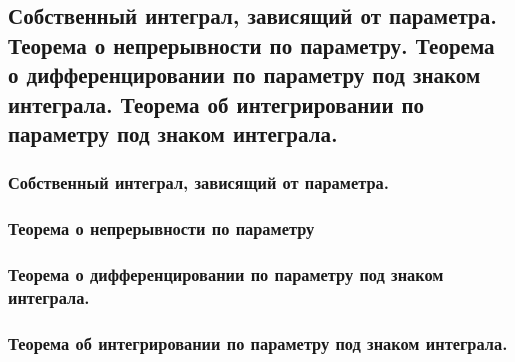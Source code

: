 \subsection{Собственный интеграл, зависящий от параметра. Теорема о непрерывности по параметру. Теорема о дифференцировании по параметру под знаком интеграла. Теорема об интегрировании по параметру под знаком интеграла.}

\subsubsection{Собственный интеграл, зависящий от параметра.}

\subsubsection{Теорема о непрерывности по параметру}

\subsubsection{Теорема о дифференцировании по параметру под знаком интеграла.}

\subsubsection{Теорема об интегрировании по параметру под знаком интеграла.}